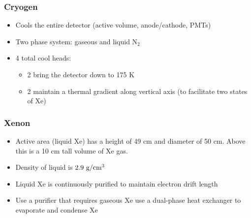 \subsubsection{Cryogen}
\begin{itemize}
  \item Cools the entire detector (active volume, anode/cathode, PMTs)
  \item Two phase system: gaseous and liquid N$_2$
  \item 4 total cool heads:
  \begin{itemize}
    \item 2 bring the detector down to 175 K
    \item 2 maintain a thermal gradient along vertical axis (to facilitate two states of Xe)
  \end{itemize}
\end{itemize}

\subsubsection{Xenon}
\begin{itemize}
  \item Active area (liquid Xe) has a height of 49 cm and diameter of 50 cm. Above this is a 10 cm tall volume of Xe gas.
  \item Density of liquid is $2.9~\text{g}/\text{cm}^3$
  \item Liquid Xe is continuously purified to maintain electron drift length
  \item Use a purifier that requires gaseous Xe \thus use a dual-phase heat exchanger to evaporate and condense Xe
\end{itemize}

